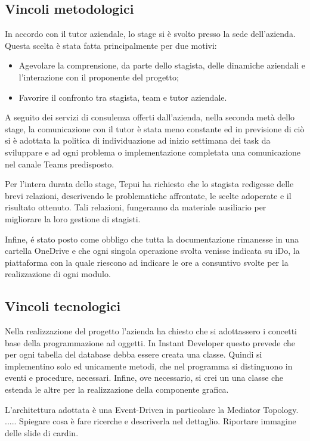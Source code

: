\subsection{Vincoli metodologici}
In accordo con il tutor aziendale, lo stage si è svolto presso la sede dell'azienda. Questa scelta è stata fatta principalmente per due motivi: 
\begin{itemize}
	\item Agevolare la comprensione, da parte dello stagista, delle dinamiche aziendali e l’interazione con il proponente del progetto; 
	\item Favorire il confronto tra stagista, team e tutor aziendale.
\end{itemize}
A seguito dei servizi di consulenza offerti dall'azienda, nella seconda metà dello stage, la comunicazione con il tutor è stata meno constante ed in previsione di ciò si è adottata la politica di individuazione ad inizio settimana dei task da sviluppare e ad ogni problema o implementazione completata una comunicazione nel canale Teams predisposto.

Per l'intera durata dello stage, Tepui ha richiesto che lo stagista redigesse delle brevi relazioni, descrivendo le problematiche affrontate, le scelte adoperate e il risultato ottenuto. Tali relazioni, fungeranno da materiale ausiliario per migliorare la loro gestione di stagisti.

Infine, é stato posto come obbligo che tutta la documentazione rimanesse in una cartella OneDrive e che ogni singola operazione svolta venisse indicata su iDo, la piattaforma con la quale riescono ad indicare le ore a consuntivo svolte per la realizzazione di ogni modulo.


\subsection{Vincoli tecnologici}
Nella realizzazione del progetto l'azienda ha chiesto che si adottassero i concetti base della programmazione ad oggetti. In Instant Developer questo prevede che per ogni tabella del database debba essere creata una classe. Quindi si implementino solo ed unicamente metodi, che nel programma si distinguono in eventi e procedure, necessari. Infine, ove necessario, si crei un una classe che estenda le altre per la realizzazione della componente grafica.

L'architettura adottata è una Event-Driven in particolare la Mediator Topology. .....
Spiegare cosa è fare ricerche e descriverla nel dettaglio. Riportare immagine delle slide di cardin.


